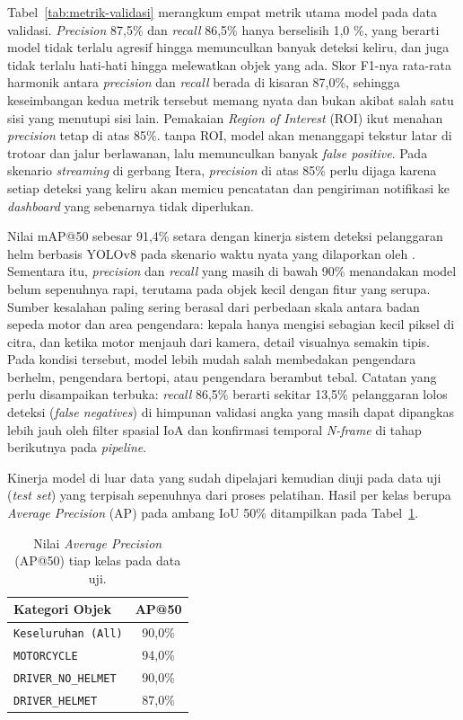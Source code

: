Tabel~\ref{tab:metrik-validasi} merangkum empat metrik utama model pada data validasi. \textit{Precision} 87,5\% dan \textit{recall} 86,5\% hanya berselisih 1,0 \%, yang berarti model tidak terlalu agresif hingga memunculkan banyak deteksi keliru, dan juga tidak terlalu hati-hati hingga melewatkan objek yang ada. Skor F1-nya rata-rata harmonik antara \textit{precision} dan \textit{recall} berada di kisaran 87,0\%, sehingga keseimbangan kedua metrik tersebut memang nyata dan bukan akibat salah satu sisi yang menutupi sisi lain. Pemakaian \textit{Region of Interest} (ROI) ikut menahan \textit{precision} tetap di atas 85\%. tanpa ROI, model akan menanggapi tekstur latar di trotoar dan jalur berlawanan, lalu memunculkan banyak \textit{false positive}. Pada skenario \textit{streaming} di gerbang Itera, \textit{precision} di atas 85\% perlu dijaga karena setiap deteksi yang keliru akan memicu pencatatan dan pengiriman notifikasi ke \textit{dashboard} yang sebenarnya tidak diperlukan.

Nilai mAP@50 sebesar 91,4\% setara dengan kinerja sistem deteksi pelanggaran helm berbasis YOLOv8 pada skenario waktu nyata yang dilaporkan oleh \cite{aboah2023helmet}. Sementara itu, \textit{precision} dan \textit{recall} yang masih di bawah 90\% menandakan model belum sepenuhnya rapi, terutama pada objek kecil dengan fitur yang serupa. Sumber kesalahan paling sering berasal dari perbedaan skala antara badan sepeda motor dan area pengendara: kepala hanya mengisi sebagian kecil piksel di citra, dan ketika motor menjauh dari kamera, detail visualnya semakin tipis. Pada kondisi tersebut, model lebih mudah salah membedakan pengendara berhelm, pengendara bertopi, atau pengendara berambut tebal. Catatan yang perlu disampaikan terbuka: \textit{recall} 86,5\% berarti sekitar 13,5\% pelanggaran lolos deteksi (\textit{false negatives}) di himpunan validasi angka yang masih dapat dipangkas lebih jauh oleh filter spasial IoA dan konfirmasi temporal \textit{N-frame} di tahap berikutnya pada \textit{pipeline}.

Kinerja model di luar data yang sudah dipelajari kemudian diuji pada data uji (\textit{test set}) yang terpisah sepenuhnya dari proses pelatihan. Hasil per kelas berupa \textit{Average Precision} (AP) pada ambang IoU 50\% ditampilkan pada Tabel~\ref{tab:metrik-test-objek}.

\begin{table}[htbp]
\centering
\caption{Nilai \textit{Average Precision} (AP@50) tiap kelas pada data uji.}
\label{tab:metrik-test-objek}
\begin{tabular}{lc}
\toprule
\textbf{Kategori Objek} & \textbf{AP@50} \\
\midrule
\texttt{Keseluruhan (All)}  & 90,0\% \\
\texttt{MOTORCYCLE}         & 94,0\% \\
\texttt{DRIVER\_NO\_HELMET} & 90,0\% \\
\texttt{DRIVER\_HELMET}     & 87,0\% \\
\bottomrule
\end{tabular}
\end{table}


